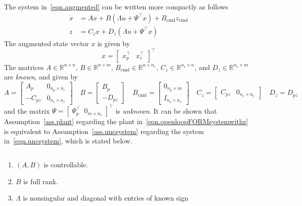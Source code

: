 \documentclass[]{../sty/aiaa-tc}
\theoremstyle{examplestyle}
\newenvironment{customthm}[1]
  {\renewcommand\theinnercustomthm{#1}\innercustomthm\normalfont}
  {\endinnercustomthm}
\begin{document}
  The system in\ \eqref{eqn.augmented} can be written more compactly as follows
  \begin{equation}
    \label{eqn.uncsystem}
    \begin{split}
      \dot{x} &= Ax+B(\Lambda u+\Psi^{\top}x)+B_{\text{cmd}}z_{\text{cmd}} \\
      z &= C_{z}x + D_{z}(\Lambda u + \Psi^{\top} x)
    \end{split}
  \end{equation}
  The augmented state vector $x$ is given by
  \begin{equation*}
    x =
    \begin{bmatrix}
      x_{p}^{\top} &
      x_{e}^{\top}
    \end{bmatrix}^{\top}
  \end{equation*}
  The matrices $A\in\mathbb{R}^{n\times n}$, $B\in\mathbb{R}^{n\times m}$, $B_{\text{cmd}}\in\mathbb{R}^{n\times n_{e}}$, $C_{z}\in\mathbb{R}^{n_{e}\times n}$, and $D_{z}\in\mathbb{R}^{n_{e}\times m}$ are \textit{known}, and given by
  \begin{equation*}
    A=
    \begin{bmatrix}
      A_{p} & 0_{n_{p}\times n_{e}} \\
      -C_{pz} & 0_{n_{e}\times n_{e}}
    \end{bmatrix} \quad
    B=
    \begin{bmatrix}
      B_{p} \\
      -D_{pz}
    \end{bmatrix}
    \quad
    B_{\text{cmd}}=
    \begin{bmatrix}
      0_{n_{p}\times m} \\
      I_{n_{e}\times n_{e}}
    \end{bmatrix}
    \quad
    C_{z} =
    \begin{bmatrix}
      C_{pz} & 0_{n_{e}\times n_{e}}
    \end{bmatrix}
    \quad
    D_{z} = D_{pz}
  \end{equation*}
  and the matrix $\Psi=[\;\Psi_{p}^{\top}\;\;0_{m\times n_{e}}\;]^{\top}$ is \textit{unknown}.
  It can be shown that Assumption~\ref{ass.plant} regarding the plant in\ \eqref{eqn.openloopFORMsystemwithz} is equivalent to Assumption~\ref{ass.uncsystem} regarding the system in\ \eqref{eqn.uncsystem}, which is stated below.

  \begin{customthm}{$1^{\prime}$} $\;$\label{ass.uncsystem}
    \begin{enumerate}[\Alph{enumi}), ref=\Alph{enumi}] %
      \itemsep0em
      \item{$(A,B)$ is controllable.\label{ass.cont}}
      \item{$B$ is full rank.\label{ass.rank}}
      \item{$\Lambda$ is nonsingular and diagonal with entries of known sign\label{ass.unc}}
    \end{enumerate}
  \end{customthm}
\end{document}
